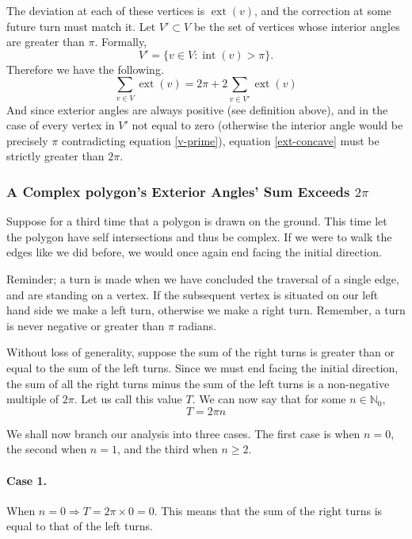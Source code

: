 \documentclass{article}
\newcommand{\inta}[1]{\operatorname{int}\left( #1 \right)} %
\newcommand{\exta}[1]{\operatorname{ext}\left( #1 \right)} %
\begin{document}
The deviation at each of these vertices is \(\exta{v}\), and the correction at some future turn must match it. Let \(V' \subset V\) be the set of vertices whose interior angles are greater than \(\pi\). Formally,
\begin{equation}
	V' = \{ v \in V : \inta{v} > \pi \}.
	\label{v-prime}
\end{equation}
Therefore we have the following.
\begin{equation}
	\sum_{v \in V} \exta{v} = 2\pi + 2\sum_{v \in V'} \exta{v}
	\label{ext-concave}
\end{equation}
And since exterior angles are always positive (see definition above), and in the case of every vertex in \(V'\) not equal to zero (otherwise the interior angle would be precisely \(\pi\) contradicting equation \ref{v-prime}), equation \ref{ext-concave} must be strictly greater than \(2\pi\).

\subsubsection{A Complex polygon's Exterior Angles' Sum Exceeds \(2\pi\)}

Suppose for a third time that a polygon is drawn on the ground. This time let the polygon have self intersections and thus be complex. If we were to walk the edges like we did before, we would once again end facing the initial direction.

Reminder; a turn is made when we have concluded the traversal of a single edge, and are standing on a vertex. If the subsequent vertex is situated on our left hand side we make a left turn, otherwise we make a right turn. Remember, a turn is never negative or greater than \(\pi\) radians.

Without loss of generality, suppose the sum of the right turns is greater than or equal to the sum of the left turns. Since we must end facing the initial direction, the sum of all the right turns minus the sum of the left turns is a non-negative multiple of \(2\pi\). Let us call this value \(T\). We can now say that for some \(n \in \mathbb{N}_0\),
\begin{equation}
	T = 2\pi n
\end{equation}

We shall now branch our analysis into three cases. The first case is when \(n = 0\), the second when \(n = 1\), and the third when \(n \geq 2\).

\paragraph{Case 1.} When \(n = 0 \Rightarrow T = 2\pi \times 0 = 0\). This means that the sum of the right turns is equal to that of the left turns.
\end{document}
